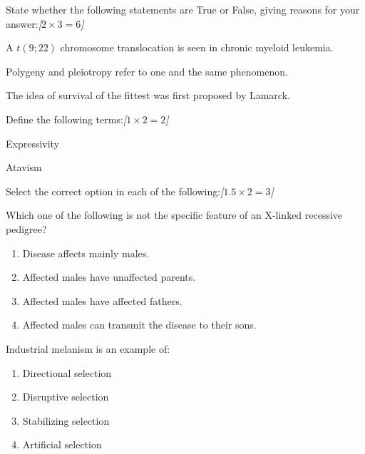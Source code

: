 \documentclass[11pt,a4paper]{article}
\newcommand{\pts}[1]{\hfill   \textit{[#1]}}
\begin{document}
\begin{parts}
  \item State whether the following statements are True or False, giving reasons for your answer:\pts{$2  \times 3 = 6$}
  
\begin{parts}
    \item A $t(9;22)$ chromosome translocation is seen in chronic myeloid leukemia.
    \item Polygeny and pleiotropy refer to one and the same phenomenon.
    \item The idea of survival of the fittest was first proposed by Lamarck.
  \end{parts}
  
  \item Define the following terms:\pts{$1  \times 2 = 2$}
  
\begin{parts}
    \item Expressivity
    \item Atavism
  \end{parts}

  \item Select the correct option in each of the following:\pts{$1.5  \times 2 = 3$}
  
\begin{parts}
    \item Which one of the following is not the specific feature of an X-linked recessive pedigree?
    
\begin{enumerate}[label=(\arabic*),leftmargin=*]
      \item Disease affects mainly males.
      \item Affected males have unaffected parents.
      \item Affected males have affected fathers.
      \item Affected males can transmit the disease to their sons.
    \end{enumerate}
    
    \item Industrial melanism is an example of:
    
\begin{enumerate}[label=(\arabic*),leftmargin=*]
      \item Directional selection
      \item Disruptive selection
      \item Stabilizing selection
      \item Artificial selection
    \end{enumerate}
  \end{parts}
\end{parts}
\end{document}
